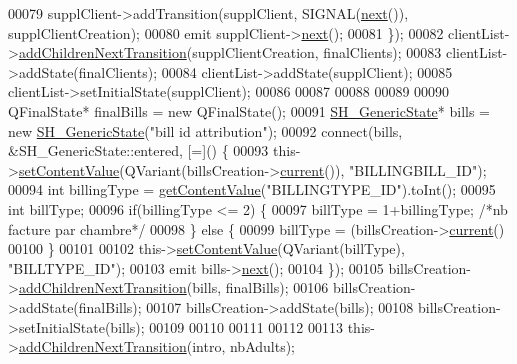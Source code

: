 \begin{DoxyCode}
00079         supplClient->addTransition(supplClient, SIGNAL(\hyperlink{classSH__InOutStateMachine_aa9ee51efe0e17dcf5366c8a97b523892}{next}()), supplClientCreation);
00080         emit supplClient->\hyperlink{classSH__GenericState_a030e67a872956135c52e6876d960a7b5}{next}();
00081     \});
00082     clientList->\hyperlink{classSh__LoopingInOutStateMachine_acfd8d0711c793b13c759f6c50be6a315}{addChildrenNextTransition}(supplClientCreation, finalClients);
00083     clientList->addState(finalClients);
00084     clientList->addState(supplClient);
00085     clientList->setInitialState(supplClient);
00086 
00087 
00088 
00089 
00090     QFinalState* finalBills = \textcolor{keyword}{new} QFinalState();
00091     \hyperlink{classSH__GenericState}{SH\_GenericState}* bills = \textcolor{keyword}{new} \hyperlink{classSH__GenericState}{SH\_GenericState}(\textcolor{stringliteral}{"bill id attribution"});
00092     connect(bills, &SH\_GenericState::entered, [=]() \{
00093         this->\hyperlink{classSH__InOutStateMachine_aa2766b7a7ba39c35a10df7fc0c151b4f}{setContentValue}(QVariant(billsCreation->\hyperlink{classSh__LoopingInOutStateMachine_a1b4661f92617e9cdbacc1be354f2a54a}{current}()), \textcolor{stringliteral}{"BILLINGBILL\_ID"});
00094         \textcolor{keywordtype}{int} billingType = \hyperlink{classSH__InOutStateMachine_a2cdd914f1e597ac52d021106eec75c89}{getContentValue}(\textcolor{stringliteral}{"BILLINGTYPE\_ID"}).toInt();
00095         \textcolor{keywordtype}{int} billType;
00096         \textcolor{keywordflow}{if}(billingType <= 2) \{
00097             billType = 1+billingType; \textcolor{comment}{/*nb facture par chambre*/}
00098         \} \textcolor{keywordflow}{else} \{
00099             billType = (billsCreation->\hyperlink{classSh__LoopingInOutStateMachine_a1b4661f92617e9cdbacc1be354f2a54a}{current}() %
00100         \}
00101 
00102         this->\hyperlink{classSH__InOutStateMachine_aa2766b7a7ba39c35a10df7fc0c151b4f}{setContentValue}(QVariant(billType), \textcolor{stringliteral}{"BILLTYPE\_ID"});
00103         emit bills->\hyperlink{classSH__GenericState_a030e67a872956135c52e6876d960a7b5}{next}();
00104     \});
00105     billsCreation->\hyperlink{classSh__LoopingInOutStateMachine_acfd8d0711c793b13c759f6c50be6a315}{addChildrenNextTransition}(bills, finalBills);
00106     billsCreation->addState(finalBills);
00107     billsCreation->addState(bills);
00108     billsCreation->setInitialState(bills);
00109 
00110 
00111 
00112 
00113     this->\hyperlink{classSH__InOutStateMachine_a689e5513ef6ef3fc1598efacd413372e}{addChildrenNextTransition}(intro, nbAdults);

\end{DoxyCode}
